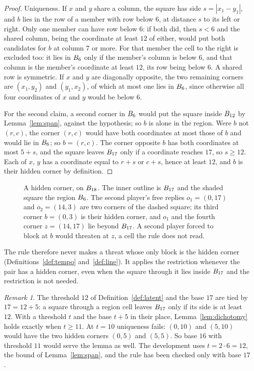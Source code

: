 \documentclass[11pt]{amsart}
\theoremstyle{definition}
\theoremstyle{remark}
\newtheorem{remark}[theorem]{Remark}
\begin{document}
\begin{proof}
Uniqueness. If $x$ and $y$ share a column, the square has side
$s = |x_1 - y_1|$, and $b$ lies in the row of a member with row below
$6$, at distance $s$ to its left or right. Only one member can have row
below $6$: if both did, then $s < 6$ and the shared column, being the
coordinate at least $12$ of either, would put both candidates for $b$
at column $7$ or more. For that member the cell to the right is
excluded too: it lies in $B_6$ only if the member's column is
below $6$, and that column is the member's coordinate at least $12$,
its row being below $6$. A shared row is symmetric. If $x$ and $y$ are diagonally
opposite, the two remaining corners are $(x_1, y_2)$ and $(y_1, x_2)$,
of which at most one lies in $B_6$, since otherwise all four
coordinates of $x$ and $y$ would be below $6$.

For the second claim, a second corner in $B_6$ would put the
square inside $B_{12}$ by Lemma~\ref{lem:span}, against the
hypothesis; so $b$ is alone in the region. Were $b$ not $(r,c)$, the
corner $(r,c)$ would have both coordinates at most those of $b$ and
would lie in $B_6$; so $b = (r,c)$. The corner opposite $b$ has
both coordinates at most $5 + s$, and the square leaves $B_{17}$
only if a coordinate reaches $17$, so $s \ge 12$. Each of $x$, $y$ has
a coordinate equal to $r + s$ or $c + s$, hence at least $12$, and $b$
is their hidden corner by definition.
\end{proof}

\begin{figure}[ht]
\centering

\caption{A hidden corner, on $B_{18}$. The inner outline is
$B_{17}$ and the shaded square the region $B_6$. The second
player's free replies
$o_1 = (0,17)$ and $o_2 = (14,3)$ are two corners of the dashed
square; its third corner $b = (0,3)$ is their hidden corner, and $o_1$
and the fourth corner $z = (14,17)$ lie beyond $B_{17}$. A second
player forced to block at $b$ would threaten at $z$, a cell the rule
does not read.}
\label{fig:latent}
\end{figure}

The rule therefore never makes a threat whose only block is the hidden
corner (Definitions~\ref{def:tempo} and~\ref{def:line}). It applies the
restriction whenever the pair has a hidden corner, even when the square
through it lies inside $B_{17}$ and the restriction is not
needed.

\begin{remark}\label{rem:base}
The threshold $12$ of Definition~\ref{def:latent} and the base $17$ are
tied by $17 = 12 + 5$: a square through a region cell leaves
$B_{17}$ only if its side is at least $12$. With a threshold $t$
and the base $t + 5$ in their place, Lemma~\ref{lem:dichotomy} holds
exactly when $t \ge 11$. At $t = 10$ uniqueness fails: $(0,10)$ and
$(5,10)$ would have the two hidden corners $(0,5)$ and $(5,5)$. So base
$16$ with threshold $11$ would serve the lemma as well. The development
uses $t = 2 \cdot 6 = 12$, the bound of Lemma~\ref{lem:span}, and the
rule has been checked only with base $17$.
\end{remark}
\end{document}
